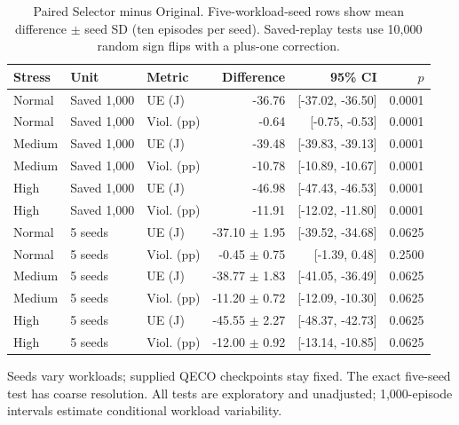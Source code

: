 \begin{table}[t]
\centering\footnotesize
\caption{Paired Selector minus Original. Five-workload-seed rows show mean difference $\pm$ seed SD (ten episodes per seed). Saved-replay tests use 10,000 random sign flips with a plus-one correction.}
\label{tab:mainstats}
\begin{tabular}{@{}lllrrr@{}}\toprule
Stress & Unit & Metric & Difference & 95\% CI & $p$\\\midrule
Normal & Saved 1,000 & UE (J) & -36.76 & [-37.02, -36.50] & 0.0001 \\
Normal & Saved 1,000 & Viol. (pp) & -0.64 & [-0.75, -0.53] & 0.0001 \\
Medium & Saved 1,000 & UE (J) & -39.48 & [-39.83, -39.13] & 0.0001 \\
Medium & Saved 1,000 & Viol. (pp) & -10.78 & [-10.89, -10.67] & 0.0001 \\
High & Saved 1,000 & UE (J) & -46.98 & [-47.43, -46.53] & 0.0001 \\
High & Saved 1,000 & Viol. (pp) & -11.91 & [-12.02, -11.80] & 0.0001 \\
Normal & 5 seeds & UE (J) & -37.10 $\pm$ 1.95 & [-39.52, -34.68] & 0.0625 \\
Normal & 5 seeds & Viol. (pp) & -0.45 $\pm$ 0.75 & [-1.39, 0.48] & 0.2500 \\
Medium & 5 seeds & UE (J) & -38.77 $\pm$ 1.83 & [-41.05, -36.49] & 0.0625 \\
Medium & 5 seeds & Viol. (pp) & -11.20 $\pm$ 0.72 & [-12.09, -10.30] & 0.0625 \\
High & 5 seeds & UE (J) & -45.55 $\pm$ 2.27 & [-48.37, -42.73] & 0.0625 \\
High & 5 seeds & Viol. (pp) & -12.00 $\pm$ 0.92 & [-13.14, -10.85] & 0.0625 \\
\bottomrule\end{tabular}

\par\smallskip\begin{minipage}{\textwidth}\footnotesize Seeds vary workloads; supplied QECO checkpoints stay fixed. The exact five-seed test has coarse resolution. All tests are exploratory and unadjusted; 1,000-episode intervals estimate conditional workload variability.\end{minipage}
\end{table}
